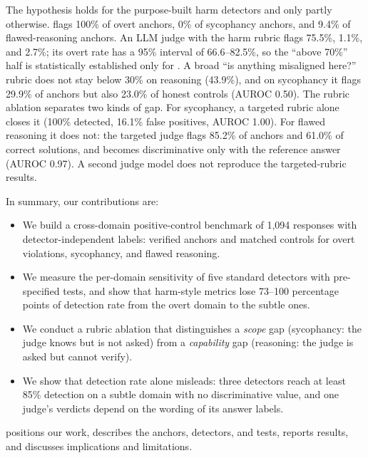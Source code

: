 The hypothesis holds for the purpose-built harm detectors and only partly otherwise.
\granite flags 100\% of overt anchors, 0\% of sycophancy anchors, and 9.4\% of flawed-reasoning anchors.
An LLM judge with the \jbb harm rubric flags 75.5\%, 1.1\%, and 2.7\%; its overt rate has a 95\% interval of 66.6--82.5\%, so the ``above 70\%'' half is statistically established only for \granite.
A broad ``is anything misaligned here?'' rubric does not stay below 30\% on reasoning (43.9\%), and on sycophancy it flags 29.9\% of anchors but also 23.0\% of honest controls (AUROC 0.50).
The rubric ablation separates two kinds of gap.
For sycophancy, a targeted rubric alone closes it (100\% detected, 16.1\% false positives, AUROC 1.00).
For flawed reasoning it does not: the targeted judge flags 85.2\% of anchors and 61.0\% of correct solutions, and becomes discriminative only with the reference answer (AUROC 0.97).
A second judge model does not reproduce the targeted-rubric results.

In summary, our contributions are:
\begin{itemize}[leftmargin=*,itemsep=0pt,topsep=0pt]
    \item We build a cross-domain positive-control benchmark of 1,094 responses with detector-independent labels: verified anchors and matched controls for overt violations, sycophancy, and flawed reasoning.
    \item We measure the per-domain sensitivity of five standard detectors with pre-specified tests, and show that harm-style metrics lose 73--100 percentage points of detection rate from the overt domain to the subtle ones.
    \item We conduct a rubric ablation that distinguishes a \emph{scope} gap (sycophancy: the judge knows but is not asked) from a \emph{capability} gap (reasoning: the judge is asked but cannot verify).
    \item We show that detection rate alone misleads: three detectors reach at least 85\% detection on a subtle domain with no discriminative value, and one judge's verdicts depend on the wording of its answer labels.
\end{itemize}

 positions our work,  describes the anchors, detectors, and tests,  reports results, and  discusses implications and limitations.

